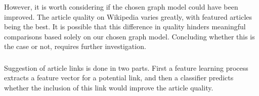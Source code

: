 However, it is worth considering if the chosen graph model could have been improved. The article quality on Wikipedia varies greatly, with featured articles being the best. It is possible that this difference in quality hinders meaningful comparisons based solely on our chosen graph model. Concluding whether this is the case or not, requires further investigation.





\subsubsection*{\subproblemtwo}
Suggestion of article links is done in two parts. First a feature learning process extracts a feature vector for a potential link, and then a classifier predicts whether the inclusion of this link would improve the article quality.

